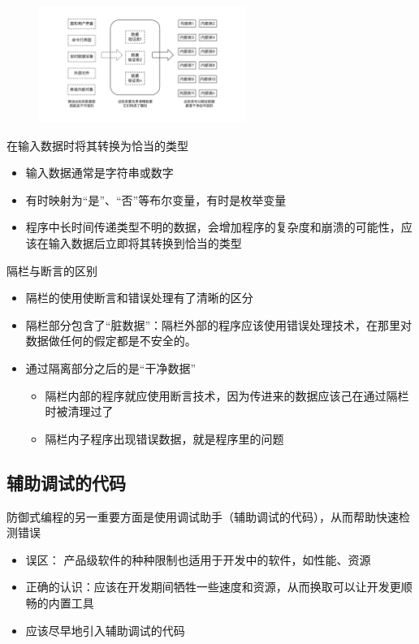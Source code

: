 \begin{figure}[H]
    \vspace{-0.5em}
	\centering
	\includegraphics[width=0.6\textwidth]{images/通过隔栏包容错误.pdf}
    \vspace{-1em}
\end{figure}

在输入数据时将其转换为恰当的类型
\begin{itemize}
    \item 输入数据通常是字符串或数字
    \item 有时映射为“是”、“否”等布尔变量，有时是枚举变量
    \item 程序中长时间传递类型不明的数据，会增加程序的复杂度和崩溃的可能性，应该在输入数据后立即将其转换到恰当的类型
\end{itemize}

隔栏与断言的区别
\begin{itemize}
    \item 隔栏的使用使断言和错误处理有了清晰的区分
    \item 隔栏部分包含了“脏数据”：隔栏外部的程序应该使用错误处理技术，在那里对数据做任何的假定都是不安全的。
    \item 通过隔离部分之后的是“干净数据”
    \begin{itemize}
        \item 隔栏内部的程序就应使用断言技术，因为传进来的数据应该己在通过隔栏时被清理过了
        \item 隔栏内子程序出现错误数据，就是程序里的问题
    \end{itemize}
\end{itemize}

\subsection{辅助调试的代码}
防御式编程的另一重要方面是使用调试助手（辅助调试的代码），从而帮助快速检测错误
\begin{itemize}
    \item 误区： 产品级软件的种种限制也适用于开发中的软件，如性能、资源
    \item 正确的认识：应该在开发期间牺牲一些速度和资源，从而换取可以让开发更顺畅的内置工具
    \item 应该尽早地引入辅助调试的代码
\end{itemize}

